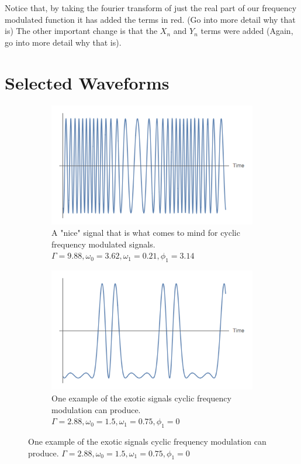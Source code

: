 \documentclass[onecolumn, groupedaddress, 10pt]{revtex4-1}
\begin{document}
Notice that, by taking the fourier transform of just the real part of our frequency modulated function it has added the terms in red.  (Go into more detail why that is)  The other important change is that the $X_n$ and $Y_n$ terms were added (Again, go into more detail why that is).

\section{Selected Waveforms}


\begin{figure}[H]
	\centering
	\begin{subfigure}{.5\textwidth}
  		\centering
  		\includegraphics[width=.9\linewidth]{classicSignal.png}
  		\caption{A "nice" signal that is what comes to mind for cyclic frequency modulated signals. $\Gamma = 9.88, \omega_0 = 3.62, \omega_1 = 0.21, \phi_1 = 3.14$ \label{fig:niceSignal}}
	\end{subfigure}%
	\begin{subfigure}{.5\textwidth}
  		\centering
  		\includegraphics[width=.9\linewidth]{interestingSignal.png}
  		\caption{One example of the exotic signals cyclic frequency modulation can produce.  $\Gamma = 2.88, \omega_0 = 1.5, \omega_1 = 0.75, \phi_1 = 0$ \label{fig:interestingSignal}}

\end{subfigure}
\end{figure}
\end{document}
